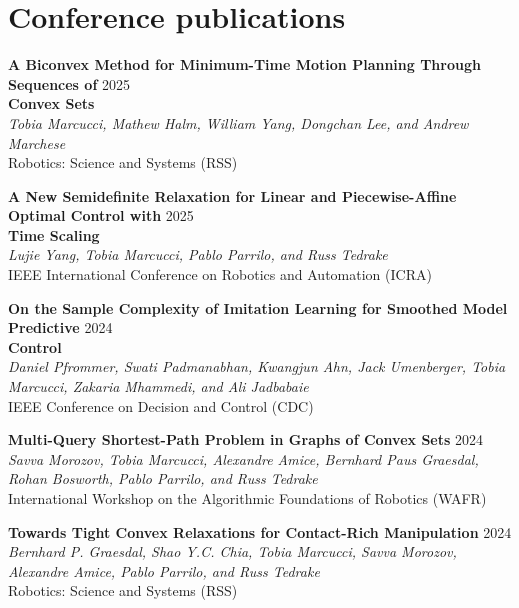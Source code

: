 \documentclass[11pt,a4paper,sans]{moderncv}
\begin{document}
\section{Conference publications}

\begin{enumerate}[label={[C\arabic*]}]
	
\item \textbf{A Biconvex Method for Minimum-Time Motion Planning Through Sequences of} \hfill 2025 \\ \textbf{Convex Sets} \\
\textit{Tobia Marcucci, Mathew Halm, William Yang, Dongchan Lee, and Andrew Marchese } \\
Robotics: Science and Systems (RSS)

\item \textbf{A New Semidefinite Relaxation for Linear and Piecewise-Affine Optimal Control with} \hfill 2025 \\ \textbf{Time Scaling} \\
\textit{Lujie Yang, Tobia Marcucci, Pablo Parrilo, and Russ Tedrake} \\
IEEE International Conference on Robotics and Automation (ICRA)
	
\item \textbf{On the Sample Complexity of Imitation Learning for Smoothed Model Predictive} \hfill 2024 \\ \textbf{Control} \\
\textit{Daniel Pfrommer, Swati Padmanabhan, Kwangjun Ahn, Jack Umenberger, Tobia Marcucci, Zakaria Mhammedi, and Ali Jadbabaie} \\
IEEE Conference on Decision and Control (CDC)
	
\item \textbf{Multi-Query Shortest-Path Problem in Graphs of Convex Sets} \hfill 2024 \\
\textit{Savva Morozov, Tobia Marcucci, Alexandre Amice, Bernhard Paus Graesdal,  Rohan Bosworth,  Pablo Parrilo, and Russ Tedrake} \\
International Workshop on the Algorithmic Foundations of Robotics (WAFR)

\item \textbf{Towards Tight Convex Relaxations for Contact-Rich Manipulation} \hfill 2024 \\
\textit{Bernhard P. Graesdal, Shao Y.C. Chia, Tobia Marcucci, Savva Morozov, Alexandre Amice, Pablo Parrilo, and Russ Tedrake} \\
Robotics: Science and Systems (RSS)


\end{enumerate}
\end{document}

